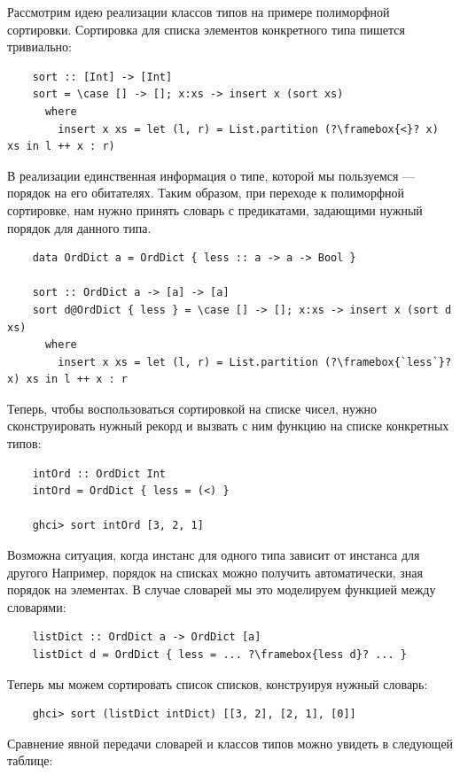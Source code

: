 Рассмотрим идею реализации классов типов на примере полиморфной сортировки.
Сортировка для списка элементов конкретного типа пишется тривиально:
\begin{verbatim}
    sort :: [Int] -> [Int]
    sort = \case [] -> []; x:xs -> insert x (sort xs)
      where
        insert x xs = let (l, r) = List.partition (?\framebox{<}? x) xs in l ++ x : r)
\end{verbatim}

В реализации единственная информация о типе, которой мы пользуемся --- порядок на его обитателях.
Таким образом, при переходе к полиморфной сортировке, нам нужно принять словарь с предикатами, задающими нужный порядок для данного типа.
\begin{verbatim}
    data OrdDict a = OrdDict { less :: a -> a -> Bool }

    sort :: OrdDict a -> [a] -> [a]
    sort d@OrdDict { less } = \case [] -> []; x:xs -> insert x (sort d xs)
      where
        insert x xs = let (l, r) = List.partition (?\framebox{`less`}? x) xs in l ++ x : r
\end{verbatim}

Теперь, чтобы воспользоваться сортировкой на списке чисел, нужно сконструировать нужный рекорд и вызвать с ним функцию на списке конкретных типов:
\begin{verbatim}
    intOrd :: OrdDict Int
    intOrd = OrdDict { less = (<) }

    ghci> sort intOrd [3, 2, 1]
\end{verbatim}

Возможна ситуация, когда инстанс для одного типа зависит от инстанса для другого
Например, порядок на списках можно получить автоматически, зная порядок на элементах.
В случае словарей мы это моделируем функцией между словарями:
\begin{verbatim}
    listDict :: OrdDict a -> OrdDict [a]
    listDict d = OrdDict { less = ... ?\framebox{less d}? ... }
\end{verbatim}

Теперь мы можем сортировать список списков, конструируя нужный словарь:
\begin{verbatim}
    ghci> sort (listDict intDict) [[3, 2], [2, 1], [0]]
\end{verbatim}

Сравнение явной передачи словарей и классов типов можно увидеть в следующей таблице:

